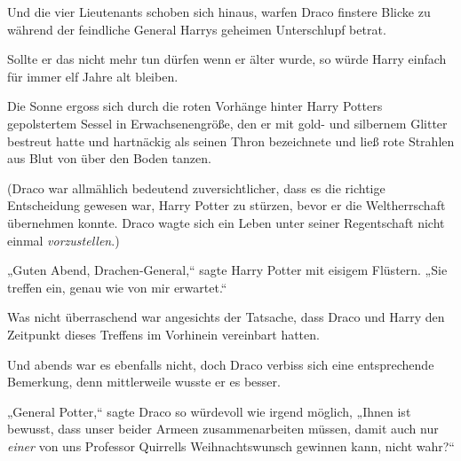Und die vier Lieutenants schoben sich hinaus, warfen Draco finstere Blicke zu während der feindliche General Harrys geheimen Unterschlupf betrat.

Sollte er das nicht mehr tun dürfen wenn er älter wurde, so würde Harry einfach für immer elf Jahre alt bleiben.

\later

Die Sonne ergoss sich durch die roten Vorhänge hinter Harry Potters gepolstertem Sessel in Erwachsenengröße, den er mit gold- und silbernem Glitter bestreut hatte und hartnäckig als seinen Thron bezeichnete und ließ rote Strahlen aus Blut von über den Boden tanzen.

(Draco war allmählich bedeutend zuversichtlicher, dass es die richtige Entscheidung gewesen war, Harry Potter zu stürzen, bevor er die Weltherrschaft übernehmen konnte. Draco wagte sich ein Leben unter seiner Regentschaft nicht einmal \emph{vorzustellen}.)

„Guten Abend, Drachen-General,“ sagte Harry Potter mit eisigem Flüstern. „Sie treffen ein, genau wie von mir erwartet.“

Was nicht überraschend war angesichts der Tatsache, dass Draco und Harry den Zeitpunkt dieses Treffens im Vorhinein vereinbart hatten.

Und abends war es ebenfalls nicht, doch Draco verbiss sich eine entsprechende Bemerkung, denn mittlerweile wusste er es besser.

„General Potter,“ sagte Draco so würdevoll wie irgend möglich, „Ihnen ist bewusst, dass unser beider Armeen zusammenarbeiten müssen, damit auch nur \emph{einer} von uns Professor Quirrells Weihnachtswunsch gewinnen kann, nicht wahr?“

